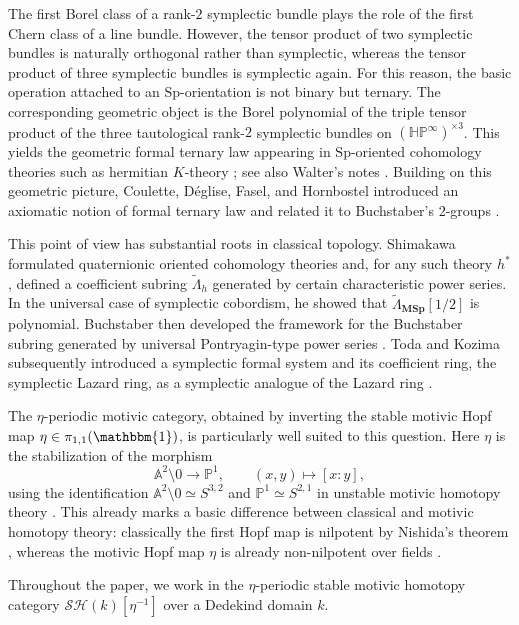 \documentclass[a4paper]{amsart}
\theoremstyle{plain}
\theoremstyle{definition}
\newcommand{\Sp}{\mathrm{Sp}}
\newcommand{\MSp}{\mathbf{MSp}}
\newcommand{\etainv}{\eta^{-1}}
\newcommand{\HP}{\mathbb{HP}}
\newcommand{\SH}{\mathcal{SH}}
\begin{document}
The first Borel class of a rank-$2$ symplectic bundle plays the role of the first Chern class of a line bundle. However, the tensor product of two symplectic bundles is naturally orthogonal rather than symplectic, whereas the tensor product of three symplectic bundles is symplectic again. For this reason, the basic operation attached to an $\Sp$-orientation is not binary but ternary. The corresponding geometric object is the Borel polynomial of the triple tensor product of the three tautological rank-$2$ symplectic bundles on $(\HP^\infty)^{\times 3}$. This yields the geometric formal ternary law appearing in $\Sp$-oriented cohomology theories such as hermitian $K$-theory \cite{deglise2023the,fasel2025the}; see also Walter's notes \cite{walter2012formal}. Building on this geometric picture, Coulette, Déglise, Fasel, and Hornbostel introduced an axiomatic notion of formal ternary law and related it to Buchstaber's $2$-groups \cite{coulette2024formal}.

This point of view has substantial roots in classical topology. Shimakawa \cite{shimakawa1976remarks} formulated quaternionic oriented cohomology theories and, for any such theory $h^{*}$, defined a coefficient subring $\widetilde{\Lambda}_h$ generated by certain characteristic power series. In the universal case of symplectic cobordism, he showed that $\widetilde{\Lambda}_{\MSp}[1/2]$ is polynomial. Buchstaber then developed the framework for the Buchstaber subring generated by universal Pontryagin-type power series \cite{buchstaber1978characteristic}. Toda and Kozima subsequently introduced a symplectic formal system and its coefficient ring, the symplectic Lazard ring, as a symplectic analogue of the Lazard ring \cite{toda1982the}.

The $\eta$-periodic motivic category, obtained by inverting the stable motivic Hopf map $\eta\in \pi_{1,1}(\mathbbm{1})$, is particularly well suited to this question. Here $\eta$ is the stabilization of the morphism
\[
	\mathbb{A}^{2}\setminus 0 \to \mathbb{P}^{1},\qquad (x,y)\mapsto [x:y],
\]
using the identification $\mathbb{A}^{2}\setminus 0 \simeq S^{3,2}$ and $\mathbb{P}^{1}\simeq S^{2,1}$ in unstable motivic homotopy theory \cite{morel1999a1}. This already marks a basic difference between classical and motivic homotopy theory: classically the first Hopf map is nilpotent by Nishida's theorem \cite{nishida1973nilpotency}, whereas the motivic Hopf map $\eta$ is already non-nilpotent over fields \cite{morel2004pi0}.

Throughout the paper, we work in the $\eta$-periodic stable motivic homotopy category $\SH(k)[\etainv]$ over a Dedekind domain $k$.
\end{document}

